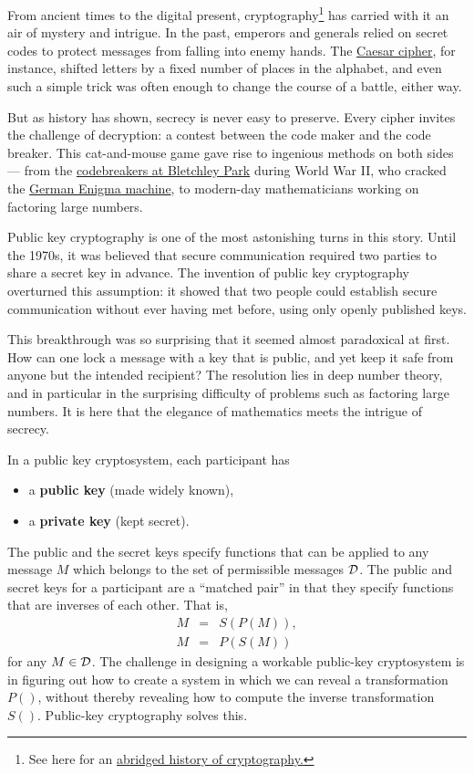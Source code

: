 From ancient times to the digital present, cryptography\footnote{See here for an \href{https://courses.cs.washington.edu/courses/cse490h1/19wi/exhibit/artifacts/crypto.pdf}{abridged history of cryptography.}} has carried with it an air of 
mystery and intrigue. In the past, emperors and generals relied on secret codes to 
protect messages from falling into enemy hands. The \href{https://en.wikipedia.org/wiki/Caesar\_cipher}{Caesar cipher}, for instance, shifted 
letters by a fixed number of places in the alphabet, and even such a simple trick was 
often enough to change the course of a battle, either way.

But as history has shown, secrecy is never easy to preserve. 
Every cipher invites the challenge of decryption: a contest between the code maker and 
the code breaker. This cat-and-mouse game gave rise to ingenious methods on both sides 
— from the \href{https://en.wikipedia.org/wiki/Bletchley\_Park}{codebreakers at Bletchley Park} during World War II, who cracked the \href{https://en.wikipedia.org/wiki/Enigma\_machine}{German 
Enigma machine}, to modern-day mathematicians working on factoring large numbers.

Public key cryptography is one of the most astonishing turns in this story. 
Until the 1970s, it was believed that secure communication required two parties to 
share a secret key in advance. The invention of public key cryptography overturned this 
assumption: it showed that two people could establish secure communication without ever 
having met before, using only openly published keys. 

This breakthrough was so surprising that it seemed almost paradoxical at first. 
How can one lock a message with a key that is public, and yet keep it safe from anyone 
but the intended recipient? The resolution lies in deep number theory, and in particular 
in the surprising difficulty of problems such as factoring large numbers. 
It is here that the elegance of mathematics meets the intrigue of secrecy.

In a public key cryptosystem, each participant has
\begin{itemize}
\item a \textbf{public key} (made widely known),
\item a \textbf{private key} (kept secret).
\end{itemize}
The public and the secret keys specify functions that can be
applied to any message $M$ which belongs to the set of permissible
messages ${\cal D}$.  The public and secret keys for a participant are a ``matched
pair'' in that they specify functions that are inverses of each other.
That is,
\[
\begin{array}{lll}
M & =  &S(P(M)), \\
M  &=  &P(S(M))
\end{array}
\]
for any $M \in {\cal D}$.
The challenge in designing a workable public-key cryptosystem is in figuring out how to create a system in which we can reveal a transformation $P()$, without thereby revealing how to compute the inverse transformation $S()$. Public-key cryptography solves this.

